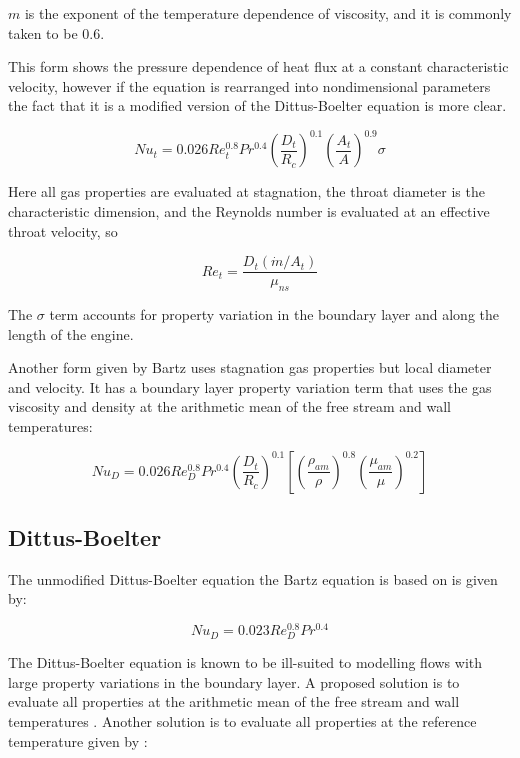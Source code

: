 \documentclass[11pt]{article}
\begin{document}
$m$ is the exponent of the temperature dependence of viscosity, and it is commonly taken to be 0.6.

This form shows the pressure dependence of heat flux at a constant characteristic velocity, however if the equation is rearranged into nondimensional parameters the fact that it is a modified version of the Dittus-Boelter equation is more clear.

\begin{equation}
  Nu_{t} = 0.026 Re_{t}^{0.8} Pr^{0.4} \left( \frac{D_t}{R_c} \right)^{0.1} \left( \frac{A_t}{A} \right)^{0.9} \sigma
\end{equation}

Here all gas properties are evaluated at stagnation, the throat diameter is the characteristic dimension, and the Reynolds number is evaluated at an effective throat velocity, so

\begin{equation}
  Re_{t} = \frac{D_t (\dot{m} / A_t)}{ \mu_{ns}}
\end{equation}

The $\sigma$ term accounts for property variation in the boundary layer and along the length of the engine.

Another form given by Bartz uses stagnation gas properties but local diameter and velocity. It has a boundary layer property variation term that uses the gas viscosity and density at the arithmetic mean of the free stream and wall temperatures:

\begin{equation}
  Nu_{D} = 0.026 Re_{D}^{0.8} Pr^{0.4} \left( \frac{D_t}{R_c} \right)^{0.1} \left[ \left( \frac{\rho_{am}}{\rho} \right)^{0.8} \left(\frac{\mu_{am}}{\mu} \right)^{0.2}\right]
\end{equation}


\subsection{Dittus-Boelter}

The unmodified Dittus-Boelter equation the Bartz equation is based on is given by:


\begin{equation}
  Nu_{D} = 0.023 Re_{D}^{0.8} Pr^{0.4}
\end{equation}

The Dittus-Boelter equation is known to be ill-suited to modelling flows with large property variations in the boundary layer. A proposed solution is to evaluate all properties at the arithmetic mean of the free stream and wall temperatures \cite{}. Another solution is to evaluate all properties at the reference temperature given by \cite{}:
\end{document}
